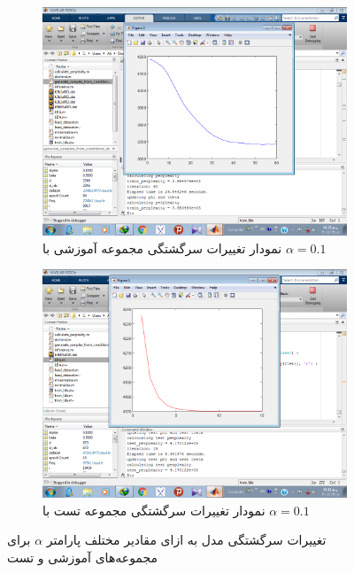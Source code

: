 \documentclass[11.5pt,a4paper]{article}
\begin{document}
\begin{figure}[h]
	\begin{subfigure}{.45\textwidth}
		\includegraphics[scale=0.25]{Imgs/k3_b05_a010_26s_ptr3683480.png}
		\caption{نمودار تغییرات سرگشتگی مجموعه‌ آموزشی با $\alpha = 0.1$}
	\end{subfigure}
	\begin{subfigure}{.45\textwidth}
		\includegraphics[scale=0.25]{Imgs/k3_b05_a010_8s_pts4170122.png}
		\caption{نمودار تغییرات سرگشتگی مجموعه‌ تست با $\alpha = 0.1$}
	\end{subfigure}
\caption{تغییرات سرگشتگی مدل به ازای مقادیر مختلف پارامتر $\alpha$ برای مجموعه‌های آموزشی و تست
}
\label{fig:alpha}
\end{figure} 
\end{document}
